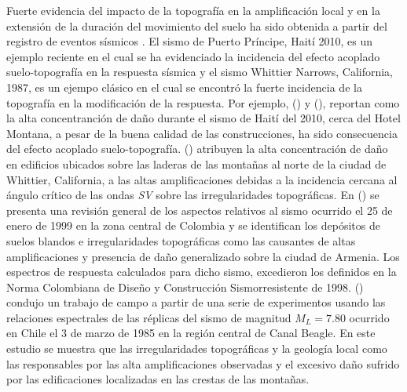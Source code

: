 \documentclass[spanish,letterpaper,12pt,twoside,openany]{article}
\begin{document}
Fuerte evidencia del impacto de la topografía en la amplificación local y en la extensión de la duración del movimiento del suelo ha sido obtenida a partir del registro de eventos sísmicos \citep{Hough2011, assimaki2005effects, spudich1996directional, kawase1990topography, celebi1987topographical, trifunac1971analysis}. El sismo de Puerto Príncipe, Haití 2010, es un ejemplo reciente en el cual se ha evidenciado la incidencia del efecto acoplado suelo-topografía en la respuesta sísmica y el sismo Whittier Narrows, California, 1987, es un ejempo clásico en el cual se encontró la fuerte incidencia de la topografía en la modificación de la respuesta. Por ejemplo, \citeauthor{Assimaki2013} (\citeyear{Assimaki2013}) y \citeauthor{Hough2011} (\citeyear{Hough2011}), reportan como la alta concentranción de daño durante el sismo de Haití del 2010, cerca del Hotel Montana, a pesar de la buena calidad de las construcciones, ha sido consecuencia del efecto acoplado suelo-topografía. \citeauthor{kawase1990topography} (\citeyear{kawase1990topography}) atribuyen la alta concentración de daño en edificios ubicados sobre las laderas de las montañas al norte de la ciudad de Whittier, California, a las altas amplificaciones debidas a la incidencia cercana al ángulo crítico de las ondas \textit{SV} sobre las irregularidades topográficas. En \citeauthor{SanchezSilva2000} (\citeyear{SanchezSilva2000}) se presenta una revisión general de los aspectos relativos al sismo ocurrido el 25 de enero de 1999 en la zona central de Colombia y se identifican los depósitos de suelos blandos e irregularidades topográficas como las causantes de altas amplificaciones y presencia de daño generalizado sobre la ciudad de Armenia. Los espectros de respuesta calculados para dicho sismo, excedieron los definidos en la Norma Colombiana de Diseño y Construcción Sismorresistente de 1998. \citeauthor{celebi1987topographical} (\citeyear{celebi1987topographical}) condujo un trabajo de campo a partir de una serie de experimentos usando las relaciones espectrales de las réplicas del sismo de magnitud $M_L=7.80$ ocurrido en Chile el 3 de marzo de 1985 en la región central de Canal Beagle. En este estudio se muestra que las irregularidades topográficas y la geología local como las responsables por las alta amplificaciones observadas y el excesivo daño sufrido por las edificaciones localizadas en las crestas de las montañas.
\end{document}
